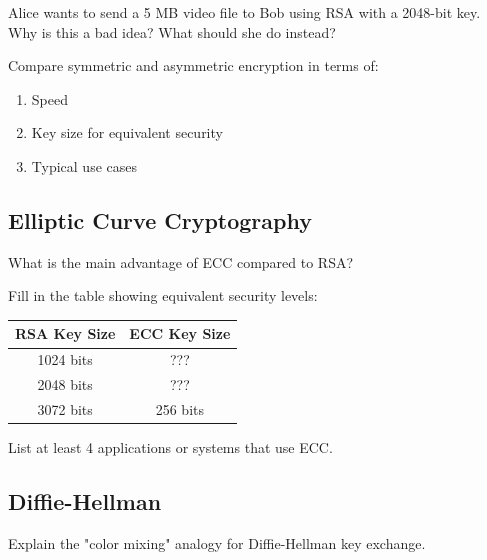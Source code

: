 \documentclass[11pt,a4paper]{report}
\begin{document}
\begin{ex}
Alice wants to send a 5 MB video file to Bob using RSA with a 2048-bit key. Why is this a bad idea? What should she do instead?
\end{ex}

\begin{ex}
Compare symmetric and asymmetric encryption in terms of:
\begin{enumerate}[label=\alph*)]
    \item Speed
    \item Key size for equivalent security
    \item Typical use cases
\end{enumerate}
\end{ex}

\subsection{Elliptic Curve Cryptography}

\begin{ex}
What is the main advantage of ECC compared to RSA?
\end{ex}

\begin{ex}
Fill in the table showing equivalent security levels:

\begin{center}
\begin{tabular}{|c|c|}
\hline
\textbf{RSA Key Size} & \textbf{ECC Key Size} \\
\hline
1024 bits & ??? \\
2048 bits & ??? \\
3072 bits & 256 bits \\
\hline
\end{tabular}
\end{center}
\end{ex}

\begin{ex}
List at least 4 applications or systems that use ECC.
\end{ex}

\subsection{Diffie-Hellman}

\begin{ex}
Explain the "color mixing" analogy for Diffie-Hellman key exchange.
\end{ex}
\end{document}
